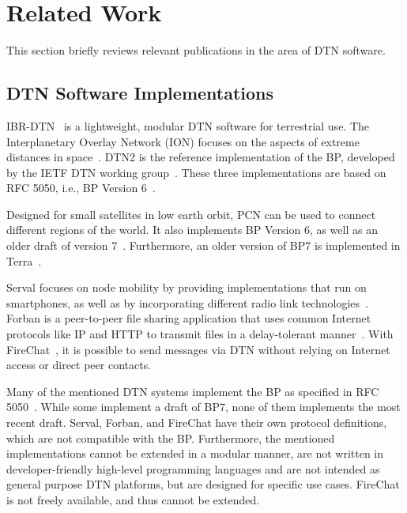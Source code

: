 \section{Related Work}
\label{penning2019dtn7:sec:relwork}

This section briefly reviews relevant publications in the area of DTN software.

\subsection{DTN Software Implementations}

IBR-DTN~\cite{doering2008ibr} is a lightweight, modular DTN software for terrestrial use.  
The Interplanetary Overlay Network (ION)
focuses on the aspects of extreme distances in space~\cite{burleigh2007interplanetary}.
DTN2 is the reference implementation of the BP, developed by the IETF DTN working group~\cite{demmer2004implementing}.
These three implementations are based on RFC 5050, i.e., BP Version 6~\cite{rfc5050}.

Designed for small satellites in low earth orbit, {\textmu}PCN can be used to connect different regions of the world.
It also implements BP Version 6, as well as an older draft of version 7~\cite{feldmann2015upcn}.
Furthermore, an older version of BP7 is implemented in Terra~\cite{rightmesh2019Terra}.

Serval focuses on node mobility by providing implementations that run on smartphones, as well as by incorporating different radio link technologies~\cite{gardner2011serval}.
Forban is a peer-to-peer file sharing application that uses common Internet protocols like IP and HTTP to transmit files in a delay-tolerant manner~\cite{dulauny2019forban}.
With FireChat~\cite{garden2015firechat}, it is possible to send messages via DTN without relying on Internet access or direct peer contacts.

Many of the mentioned DTN systems implement the BP as specified in RFC 5050~\cite{rfc5050}.
While some implement a draft of BP7, none of them implements the most recent draft.
Serval, Forban, and FireChat have their own protocol definitions, which are not compatible with the BP.
Furthermore, the mentioned implementations cannot be extended in a modular manner, are not written in developer-friendly high-level programming languages and are not intended as general purpose DTN platforms, but are designed for specific use cases.
FireChat is not freely available, and thus cannot be extended.

